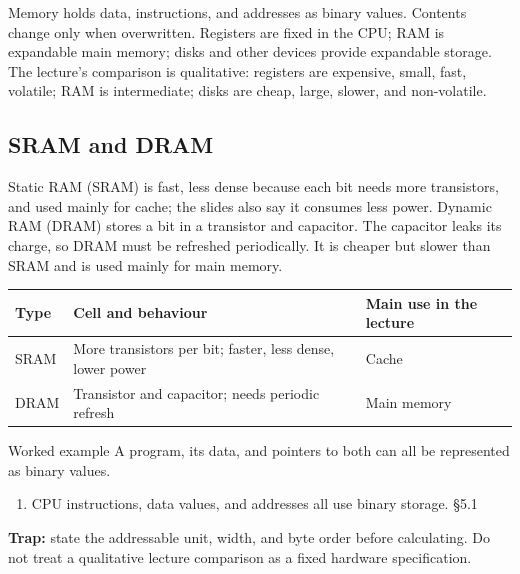 \documentclass[11pt]{article}
\begin{document}
\begin{keepsection}
Memory holds data, instructions, and addresses as binary values. Contents change only when overwritten. Registers are fixed in the CPU; RAM is expandable main memory; disks and other devices provide expandable storage. The lecture’s comparison is qualitative: registers are expensive, small, fast, volatile; RAM is intermediate; disks are cheap, large, slower, and non-volatile.

\begin{keepsection}
\subsection{SRAM and DRAM}

Static RAM (SRAM) is fast, less dense because each bit needs more transistors, and used mainly for cache; the slides also say it consumes less power. Dynamic RAM (DRAM) stores a bit in a transistor and capacitor. The capacitor leaks its charge, so DRAM must be refreshed periodically. It is cheaper but slower than SRAM and is used mainly for main memory.

\begin{center}\small\begin{tabularx}{\linewidth}{>{\raggedright\arraybackslash}X>{\raggedright\arraybackslash}X>{\raggedright\arraybackslash}X}\toprule
\textbf{Type} & \textbf{Cell and behaviour} & \textbf{Main use in the lecture} \\ \midrule
SRAM & More transistors per bit; faster, less dense, lower power & Cache \\
DRAM & Transistor and capacitor; needs periodic refresh & Main memory \\
\bottomrule\end{tabularx}\end{center}

\begin{workedbox}{Worked example}
A program, its data, and pointers to both can all be represented as binary values.

\begin{enumerate}
\item CPU instructions, data values, and addresses all use binary storage. \hfill{\small\color{FAUblue}§5.1}
\end{enumerate}
\end{workedbox}

\begin{notebox}\textbf{Trap:} state the addressable unit, width, and byte order before calculating. Do not treat a qualitative lecture comparison as a fixed hardware specification.\end{notebox}


\end{keepsection}
\end{keepsection}
\end{document}
